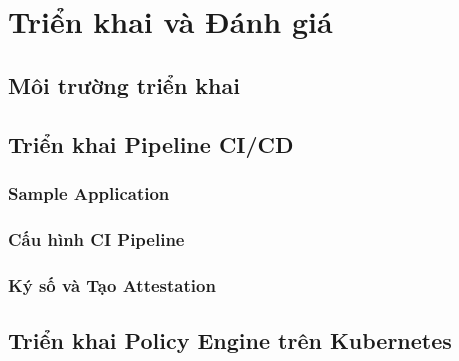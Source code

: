 \chapter{Triển khai và Đánh giá}\label{ch:implementation}

\section{Môi trường triển khai}


\section{Triển khai Pipeline CI/CD}

\subsection{Sample Application}

\subsection{Cấu hình CI Pipeline}
%

\subsection{Ký số và Tạo Attestation}

\section{Triển khai Policy Engine trên Kubernetes}

